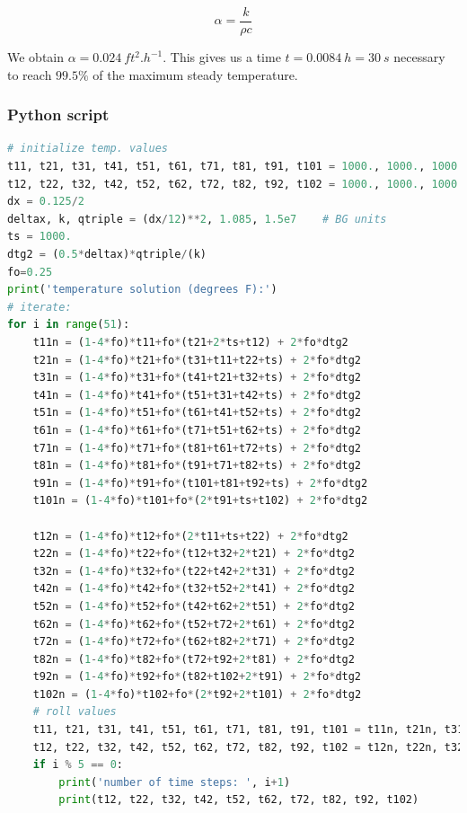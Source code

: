 \begin{equation}\label{eq720}
\alpha = \frac{k}{\rho c}
\end{equation}

We obtain $\alpha = 0.024\ ft^{2}.h^{-1}$. This gives us a time $t = 0.0084\ h = 30 \ s$ necessary to reach $99.5\%$ of the maximum steady temperature.

\newpage
\subsubsection{Python script}
\label{py2}
\begin{lstlisting}[language=python]
# initialize temp. values
t11, t21, t31, t41, t51, t61, t71, t81, t91, t101 = 1000., 1000., 1000., 1000., 1000., 1000., 1000., 1000., 1000., 1000.
t12, t22, t32, t42, t52, t62, t72, t82, t92, t102 = 1000., 1000., 1000., 1000., 1000., 1000., 1000., 1000., 1000., 1000.
dx = 0.125/2
deltax, k, qtriple = (dx/12)**2, 1.085, 1.5e7    # BG units
ts = 1000.
dtg2 = (0.5*deltax)*qtriple/(k)
fo=0.25
print('temperature solution (degrees F):')
# iterate:
for i in range(51):
    t11n = (1-4*fo)*t11+fo*(t21+2*ts+t12) + 2*fo*dtg2
    t21n = (1-4*fo)*t21+fo*(t31+t11+t22+ts) + 2*fo*dtg2
    t31n = (1-4*fo)*t31+fo*(t41+t21+t32+ts) + 2*fo*dtg2
    t41n = (1-4*fo)*t41+fo*(t51+t31+t42+ts) + 2*fo*dtg2
    t51n = (1-4*fo)*t51+fo*(t61+t41+t52+ts) + 2*fo*dtg2
    t61n = (1-4*fo)*t61+fo*(t71+t51+t62+ts) + 2*fo*dtg2
    t71n = (1-4*fo)*t71+fo*(t81+t61+t72+ts) + 2*fo*dtg2
    t81n = (1-4*fo)*t81+fo*(t91+t71+t82+ts) + 2*fo*dtg2
    t91n = (1-4*fo)*t91+fo*(t101+t81+t92+ts) + 2*fo*dtg2
    t101n = (1-4*fo)*t101+fo*(2*t91+ts+t102) + 2*fo*dtg2

    t12n = (1-4*fo)*t12+fo*(2*t11+ts+t22) + 2*fo*dtg2
    t22n = (1-4*fo)*t22+fo*(t12+t32+2*t21) + 2*fo*dtg2
    t32n = (1-4*fo)*t32+fo*(t22+t42+2*t31) + 2*fo*dtg2
    t42n = (1-4*fo)*t42+fo*(t32+t52+2*t41) + 2*fo*dtg2
    t52n = (1-4*fo)*t52+fo*(t42+t62+2*t51) + 2*fo*dtg2
    t62n = (1-4*fo)*t62+fo*(t52+t72+2*t61) + 2*fo*dtg2
    t72n = (1-4*fo)*t72+fo*(t62+t82+2*t71) + 2*fo*dtg2
    t82n = (1-4*fo)*t82+fo*(t72+t92+2*t81) + 2*fo*dtg2
    t92n = (1-4*fo)*t92+fo*(t82+t102+2*t91) + 2*fo*dtg2
    t102n = (1-4*fo)*t102+fo*(2*t92+2*t101) + 2*fo*dtg2
    # roll values
    t11, t21, t31, t41, t51, t61, t71, t81, t91, t101 = t11n, t21n, t31n, t41n, t51n, t61n, t71n, t81n, t91n, t101n
    t12, t22, t32, t42, t52, t62, t72, t82, t92, t102 = t12n, t22n, t32n, t42n, t52n, t62n, t72n, t82n, t92n, t102n
    if i % 5 == 0:
        print('number of time steps: ', i+1)
        print(t12, t22, t32, t42, t52, t62, t72, t82, t92, t102)
\end{lstlisting}
\newpage

